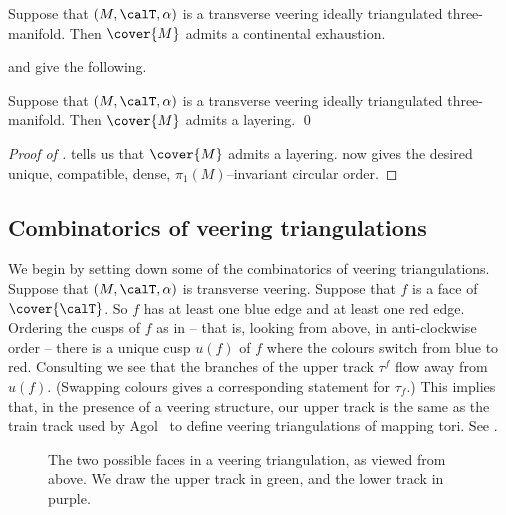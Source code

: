 \documentclass[12pt]{amsart}
\begin{document}
\begin{proposition}
\label{Prop:VeerImpliesExhaust}
Suppose that $(M, \calT, \alpha)$ is a transverse veering ideally triangulated three-manifold.  
Then $\cover{M}$ admits a continental exhaustion.
\end{proposition}

 and  give the following. 

\begin{corollary}
\label{Cor:VeerImpliesLayered}
Suppose that $(M, \calT, \alpha)$ is a transverse veering ideally triangulated three-manifold.  
Then $\cover{M}$ admits a layering.  \qed
\end{corollary}

\begin{proof}[Proof of ]
 tells us that $\cover{M}$ admits a layering.   now gives the desired unique, compatible, dense, $\pi_1(M)$--invariant circular order. 
\end{proof}

\subsection{Combinatorics of veering triangulations}

We begin by setting down some of the combinatorics of veering triangulations.  Suppose that $(M, \calT, \alpha)$ is transverse veering.  Suppose that $f$ is a face of $\cover{\calT}$.  So $f$ has at least one blue edge and at least one red edge.  Ordering the cusps of $f$ as in  -- that is, looking from above, in anti-clockwise order -- there is a unique cusp $u(f)$ of $f$ where the colours switch from blue to red.   Consulting  we see that the branches of the upper track $\tau^f$ flow away from $u(f)$.  (Swapping colours gives a corresponding statement for $\tau_f$.)  This implies that, in the presence of a veering structure, our upper track is the same as the train track used by Agol~\cite[Main~Construction]{Agol11} to define veering triangulations of mapping tori.  See .

\begin{figure}[htb]
\centering
{}
\qquad
{}
\caption{The two possible faces in a veering triangulation, as viewed from above.  We draw the upper track in green, and the lower track in purple.}  
\label{Fig:VeeringTriangles}
\end{figure}
\end{document}
